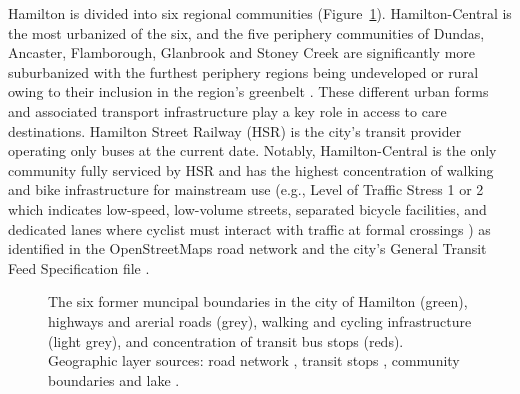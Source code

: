 \documentclass[
  authoryear,
  preprint,
  3p]{elsarticle}
\begin{document}
Hamilton is divided into six regional communities
(Figure~\ref{fig-Fig1}). Hamilton-Central is the most urbanized of the
six, and the five periphery communities of Dundas, Ancaster,
Flamborough, Glanbrook and Stoney Creek are significantly more
suburbanized with the furthest periphery regions being undeveloped or
rural owing to their inclusion in the region's greenbelt
\citep{greenbeltfoundationThrivingGreenbeltThriving2023}. These
different urban forms and associated transport infrastructure play a key
role in access to care destinations. Hamilton Street Railway (HSR) is
the city's transit provider operating only buses at the current date.
Notably, Hamilton-Central is the only community fully serviced by HSR
and has the highest concentration of walking and bike infrastructure for
mainstream use (e.g., Level of Traffic Stress 1 or 2 which indicates
low-speed, low-volume streets, separated bicycle facilities, and
dedicated lanes where cyclist must interact with traffic at formal
crossings \citep{conveyalCyclingLevelTraffic2024}) as identified in the
OpenStreetMaps road network \citep{geofabrikOntarioCanadaOpen2023} and
the city's General Transit Feed Specification file
\citep{transitfeedsHamiltonStreetRailway2023}.

\begin{figure}


\caption{\label{fig-Fig1}The six former muncipal boundaries in the city
of Hamilton (green), highways and arerial roads (grey), walking and
cycling infrastructure (light grey), and concentration of transit bus
stops (reds). Geographic layer sources: road network
\citep{geofabrikOntarioCanadaOpen2023}, transit stops
\citep{transitfeedsHamiltonStreetRailway2023}, community boundaries
\citep{opendatahamiltonCityBoundary2023} and lake
\citep{greatlakesUSGS2010}.}

\end{figure}%
\end{document}
